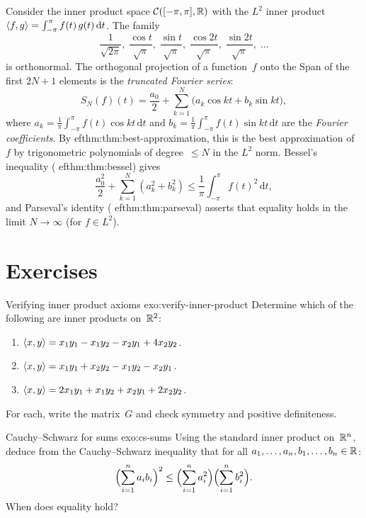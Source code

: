 Consider the inner product space $\mathcal{C}([-\pi,\pi],{\mathbb{R}})$ with the
$L^2$ inner product $\langle f,g\rangle = \int_{-\pi}^{\pi}f(t)\,g(t)\,\mathrm{d}t$.
The family
\[
  \frac{1}{\sqrt{2\pi}},\;
  \frac{\cos t}{\sqrt{\pi}},\;
  \frac{\sin t}{\sqrt{\pi}},\;
  \frac{\cos 2t}{\sqrt{\pi}},\;
  \frac{\sin 2t}{\sqrt{\pi}},\;\ldots
\]
is orthonormal.  The orthogonal projection of a function~$f$ onto the
Span of the first $2N+1$ elements is the \emph{truncated Fourier
series}:
\[
  S_N(f)(t) = \frac{a_0}{2} + \sum_{k=1}^{N}\bigl(a_k\cos kt
    + b_k\sin kt\bigr),
\]
where $a_k = \frac{1}{\pi}\int_{-\pi}^{\pi}f(t)\cos kt\,\mathrm{d}t$
and $b_k = \frac{1}{\pi}\int_{-\pi}^{\pi}f(t)\sin kt\,\mathrm{d}t$
are the \emph{Fourier coefficients}.
By 
ef{thm:thm:best-approximation}, this is the best approximation of~$f$
by trigonometric polynomials of degree~$\leq N$ in the $L^2$ norm.
Bessel's inequality (
ef{thm:thm:bessel}) gives
\[
  \frac{a_0^2}{2} + \sum_{k=1}^{N}(a_k^2 + b_k^2)
    \leq \frac{1}{\pi}\int_{-\pi}^{\pi}f(t)^2\,\mathrm{d}t,
\]
and Parseval's identity (
ef{thm:thm:parseval}) asserts that equality
holds in the limit $N\to\infty$ (for $f\in L^2$).


\section{Exercises}\label{sec:inner-product-exercises}

\begin{exercise}{Verifying inner product axioms \basic}%
{exo:verify-inner-product}
Determine which of the following are inner products on~${\mathbb{R}}^2$:
\begin{enumerate}[label=(\alph*)]
  \item $\langle x,y\rangle = x_1 y_1 - x_1 y_2 - x_2 y_1 + 4 x_2 y_2$.
  \item $\langle x,y\rangle = x_1 y_1 + x_2 y_2 - x_1 y_2 - x_2 y_1$.
  \item $\langle x,y\rangle = 2x_1 y_1 + x_1 y_2 + x_2 y_1 + 2 x_2 y_2$.
\end{enumerate}
For each, write the matrix~$G$ and check symmetry and positive
definiteness.
\end{exercise}

\begin{exercise}{Cauchy--Schwarz for sums \basic}{exo:cs-sums}
Using the standard inner product on~${\mathbb{R}}^n$, deduce from the
Cauchy--Schwarz inequality that for all $a_1,\ldots,a_n,b_1,\ldots,b_n
\in{\mathbb{R}}$:
\[
  \Bigl(\sum_{i=1}^n a_i b_i\Bigr)^2
    \leq \Bigl(\sum_{i=1}^n a_i^2\Bigr)
         \Bigl(\sum_{i=1}^n b_i^2\Bigr).
\]
When does equality hold?
\end{exercise}

